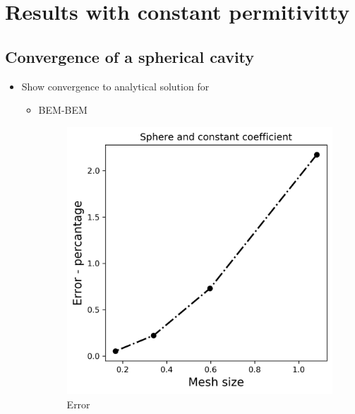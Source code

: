 \section*{\sffamily \Large Results with constant permitivitty}

\subsection*{\sffamily \large Convergence of a spherical cavity}
\begin{itemize}
    \item Show convergence to analytical solution for
    \begin{itemize}
        \item BEM-BEM
\begin{figure}[!htb]
  \includegraphics[width=\linewidth]{BEM_BEM_Sphere_const_coeff_error.png}
  \caption{Error}
\endminipage\hfill
{}

\end{figure}
\end{itemize}
\end{itemize}
